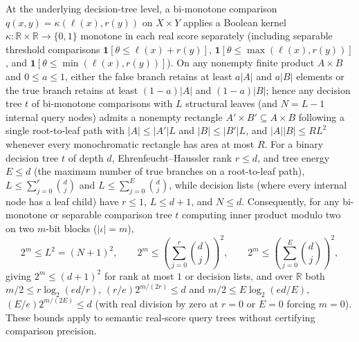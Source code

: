 \begin{result}
At the underlying decision-tree level, a bi-monotone comparison
$q(x,y)=\kappa(\ell(x),r(y))$ on $X\times Y$ applies a Boolean kernel
$\kappa:\mathbb R\times\mathbb R\to\{0,1\}$ monotone in each real score
separately (including separable threshold comparisons
$\mathbf 1[\theta\le\ell(x)+r(y)]$, $\mathbf 1[\theta\le\max(\ell(x),r(y))]$,
and $\mathbf 1[\theta\le\min(\ell(x),r(y))]$). On any nonempty finite product
$A\times B$ and $0\le a\le 1$, either the false branch retains at least $a|A|$
and $a|B|$ elements or the true branch retains at least $(1-a)|A|$ and
$(1-a)|B|$; hence any decision tree $t$ of bi-monotone comparisons with $L$
structural leaves (and $N=L-1$ internal query nodes) admits a nonempty
rectangle $A'\times B'\subseteq A\times B$ following a single root-to-leaf path
with $|A|\le |A'|L$ and $|B|\le |B'|L$, and $|A||B|\le R L^2$ whenever every
monochromatic rectangle has area at most $R$. For a binary decision tree $t$ of
depth $d$, Ehrenfeucht--Haussler rank $r\le d$, and tree energy $E\le d$ (the
maximum number of true branches on a root-to-leaf path),
$L\le\sum_{j=0}^r\binom dj$ and $L\le\sum_{j=0}^E\binom dj$, while decision
lists (where every internal node has a leaf child) have $r\le 1$, $L\le d+1$,
and $N\le d$. Consequently, for any bi-monotone or separable comparison tree $t$
computing inner product modulo two on two $m$-bit blocks ($|\iota|=m$),
\[
2^m\le L^2=(N+1)^2,\qquad
2^m\le\left(\sum_{j=0}^{r}\binom dj\right)^2,\qquad
2^m\le\left(\sum_{j=0}^{E}\binom dj\right)^2,
\]
giving $2^m\le(d+1)^2$ for rank at most $1$ or decision lists, and over $\mathbb R$
both $m/2\le r\log_2(ed/r)$, $(r/e)2^{m/(2r)}\le d$ and
$m/2\le E\log_2(ed/E)$, $(E/e)2^{m/(2E)}\le d$ (with real division by zero at
$r=0$ or $E=0$ forcing $m=0$). These bounds apply to semantic real-score query
trees without certifying comparison precision.\citep{ThresholdCircuitRepresentations2026}

\end{result}

